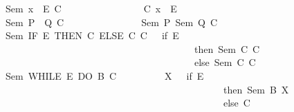 \begin{isabellebody}
\ \ \ \ \ \ \ {\isacharbar}{\kern0pt}{\isachardoublequoteopen}Sem\ {\isacharparenleft}{\kern0pt}x\ {\isacharcolon}{\kern0pt}{\isacharequal}{\kern0pt}\ E{\isacharparenright}{\kern0pt}\ C\ \ \ \ \ \ \ \ \ \ \ \ \ \ {\isacharequal}{\kern0pt}\ {\isacharparenleft}{\kern0pt}{\isasymlambda}\ {\isasymsigma}{\isachardot}{\kern0pt}\ C\ {\isacharparenleft}{\kern0pt}{\isasymsigma}{\isacharparenleft}{\kern0pt}x\ {\isacharcolon}{\kern0pt}{\isacharequal}{\kern0pt}\ E\ {\isasymsigma}{\isacharparenright}{\kern0pt}{\isacharparenright}{\kern0pt}{\isacharparenright}{\kern0pt}{\isachardoublequoteclose}\isanewline
\ \ \ \ \ \ \ {\isacharbar}{\kern0pt}{\isachardoublequoteopen}Sem\ {\isacharparenleft}{\kern0pt}P\ {\isacharsemicolon}{\kern0pt}\ Q{\isacharparenright}{\kern0pt}\ C\ \ \ \ \ \ \ \ \ \ \ \ \ \ \ {\isacharequal}{\kern0pt}\ {\isacharparenleft}{\kern0pt}Sem\ P\ {\isacharparenleft}{\kern0pt}Sem\ Q\ C{\isacharparenright}{\kern0pt}{\isacharparenright}{\kern0pt}{\isachardoublequoteclose}\ \isanewline
\ \ \ \ \ \ \ {\isacharbar}{\kern0pt}{\isachardoublequoteopen}Sem\ {\isacharparenleft}{\kern0pt}IF\ E\ THEN\ C{}\ ELSE\ C{}{\isacharparenright}{\kern0pt}\ C{\isacharequal}{\kern0pt}\ {\isacharparenleft}{\kern0pt}{\isasymlambda}\ {\isasymsigma}{\isachardot}{\kern0pt}\ if\ E\ {\isasymsigma}\ \isanewline
\ \ \ \ \ \ \ \ \ \ \ \ \ \ \ \ \ \ \ \ \ \ \ \ \ \ \ \ \ \ \ \ \ \ \ \ \ \ \ \ \ \ \ \ \ \ then\ Sem\ C{}\ C\ {\isasymsigma}\ \isanewline
\ \ \ \ \ \ \ \ \ \ \ \ \ \ \ \ \ \ \ \ \ \ \ \ \ \ \ \ \ \ \ \ \ \ \ \ \ \ \ \ \ \ \ \ \ \ else\ Sem\ C{}\ C\ {\isasymsigma}{\isacharparenright}{\kern0pt}{\isachardoublequoteclose}\isanewline
\ \ \ \ \ \ \ {\isacharbar}{\kern0pt}{\isachardoublequoteopen}Sem\ {\isacharparenleft}{\kern0pt}WHILE\ E\ DO\ B{\isacharparenright}{\kern0pt}\ C\ \ \ \ \ \ \ \ {\isacharequal}{\kern0pt}\ {\isacharparenleft}{\kern0pt}{\isasymmu}\ X{\isachardot}{\kern0pt}\ {\isacharparenleft}{\kern0pt}{\isasymlambda}\ {\isasymsigma}{\isachardot}{\kern0pt}\ if\ E\ {\isasymsigma}\ \isanewline
\ \ \ \ \ \ \ \ \ \ \ \ \ \ \ \ \ \ \ \ \ \ \ \ \ \ \ \ \ \ \ \ \ \ \ \ \ \ \ \ \ \ \ \ \ \ \ \ \ \ \ \ then\ Sem\ B\ X\ {\isasymsigma}\ \isanewline
\ \ \ \ \ \ \ \ \ \ \ \ \ \ \ \ \ \ \ \ \ \ \ \ \ \ \ \ \ \ \ \ \ \ \ \ \ \ \ \ \ \ \ \ \ \ \ \ \ \ \ \ else\ C\ {\isasymsigma}{\isacharparenright}{\kern0pt}{\isacharparenright}{\kern0pt}{\isachardoublequoteclose}\isanewline

\end{isabellebody}
